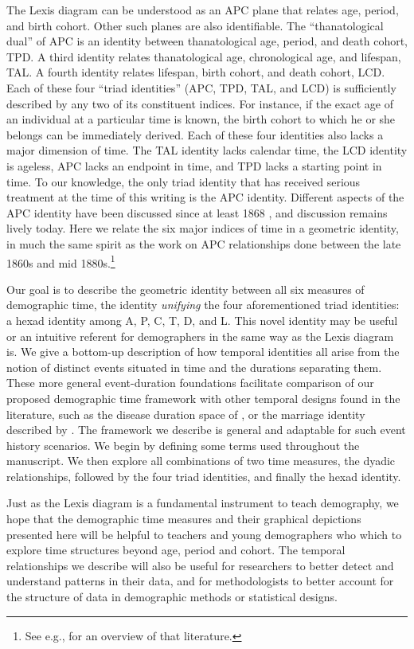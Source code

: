 \documentclass[12pt,oneside,a4paper,doublespacing]{article} %
\theoremstyle{definition}
\begin{document}
The Lexis diagram can be understood as an APC plane
that relates age, period, and birth cohort. Other such planes are
also identifiable.
The ``thanatological dual'' of APC is an identity between thanatological
age, period, and death cohort, TPD. A third identity relates thanatological age,
chronological age, and lifespan, TAL. A fourth identity relates lifespan, birth
cohort, and death cohort, LCD. Each of these four ``triad identities'' (APC, TPD, TAL, and LCD) is sufficiently
described by any two of its constituent indices. For instance, if the exact age of an individual at a particular
time is known, the birth cohort to which he or she belongs can be immediately derived. Each of these four identities also lacks a major dimension of time. The TAL identity lacks calendar time, the LCD identity is ageless, APC lacks an endpoint in time, and TPD lacks a starting point in time.
To our knowledge, the only triad identity that has received serious
treatment at the time of this writing is the APC identity. Different
aspects of the APC identity have been discussed since at least 1868
\citep{knapp1868ermittlung}, and discussion remains lively today. Here we relate the six major indices of time in a geometric identity, in much the same spirit as the work on APC relationships done between the late
1860s and mid 1880s.\footnote{See e.g., \citet{keiding2011age} for an overview of that literature.} 


Our goal is to describe the geometric identity between all
six measures of demographic time, the identity \emph{unifying} the four aforementioned triad identities: a hexad identity among A, P, C, T, D, and L. This novel identity may be useful or an intuitive
referent for demographers in the same way as the Lexis diagram is. We give a bottom-up
description of how temporal identities all arise from the notion of distinct
events situated in time and the durations separating them. These more general
event-duration foundations facilitate comparison of our proposed demographic time framework with other temporal designs found in the literature, such as the disease duration space of \citet{brinks2014lexis},
or the marriage identity described by \citet{lexis1875einleitung}.
The framework we describe is general and adaptable for such event history scenarios.
We begin by defining some terms used throughout the manuscript.
We then explore all combinations of two time measures, the dyadic relationships, followed by the four triad identities, and
finally the hexad identity.

Just as the Lexis diagram is a fundamental instrument to
teach demography, we hope that the demographic time measures and
their graphical depictions presented here will be helpful to teachers and
young demographers who which to explore time structures beyond age, period and cohort. The temporal relationships we describe will also be useful
for researchers to better detect and understand patterns in their data, and for
methodologists to better account for the structure of data in demographic
methods or statistical designs.
\end{document}
